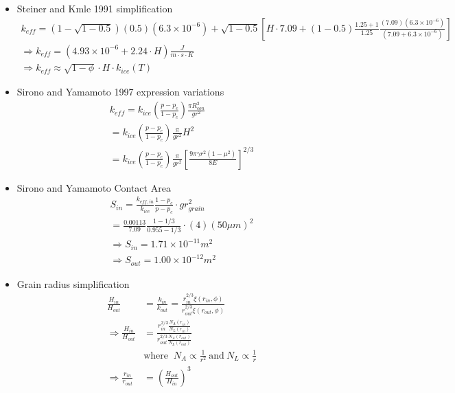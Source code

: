 \documentclass[11pt]{article} %
\begin{document}
\begin{itemize}
\item Steiner and Kmle 1991 simplification
	\begin{equation}
	\begin{gathered}
	k_{eff} = (1-\sqrt{1-0.5})(0.5)(6.3\times10^{-6}) + \sqrt{1-0.5} [ H \cdot 7.09+(1-0.5)\frac{1.25+1}{1.25}\frac{(7.09)(6.3\times10^{-6})}{(7.09+6.3\times10^{-6})} ] \\
	\Rightarrow k_{eff} = ( 4.93\times 10^{-6} + 2.24\cdot H )  \frac{J}{m \cdot s \cdot K} \\
	\Rightarrow k_{eff} \approx \sqrt{1-\phi}\cdot H \cdot k_{ice}(T)
	\end{gathered}
	\end{equation}

\item Sirono and Yamamoto 1997 expression variations
	\begin{equation}
	\begin{gathered}
	k_{eff}=k_{ice}\left( \frac{p-p_{c}}{1-p_{c}} \right) \frac{\pi R_{con}^{2}}{gr^{2}} \\
		 =k_{ice}\left( \frac{p-p_{c}}{1-p_{c}} \right) \frac{\pi}{g r^{2}} H^{2} \\
		 = k_{ice}\left( \frac{p-p_{c}}{1-p_{c}} \right) \frac{\pi}{g r^{2}}[ \frac{9 \pi \gamma r^{2} (1-\mu^{2})}{8 E} ]^{2/3}
	\end{gathered}
	\end{equation}
	
\item Sirono and Yamamoto Contact Area
	\begin{equation}
	\begin{gathered}
	S_{in} = \frac{k_{eff, in}}{k_{ice}} \frac{1-p_{c}}{p - p_{c}}\cdot g r_{grain}^{2} \\
	= \frac{0.00113}{7.09} \frac{1-1/3}{0.955-1/3} \cdot (4)(50 \mu m)^2 \\
	\Rightarrow S_{in} = 1.71\times 10^{-11} m^{2} \\
	\Rightarrow S_{out} = 1.00\times 10^{-12} m^{2}
	\end{gathered}
	\end{equation}
	
\item Grain radius simplification
	\begin{equation}
	\begin{split}
	\frac{H_{in}}{H_{out}} &= \frac{k_{in}}{k_{out}} = \frac{r_{in}^{2/3} \xi(r_{in}, \phi)}{r_{out}^{2/3} \xi(r_{out}, \phi)} \\
	\Rightarrow \frac{H_{in}}{H_{out}} &= \frac{r_{in}^{2/3} \frac{N_{A}(r_{in})}{N_{L}(r_{in})}}{r_{out}^{2/3} \frac{N_{A}(r_{out})}{N_{L}(r_{out})}} \\
	& \text{where }\: N_{A}\varpropto \frac{1}{r^{2}} \: \text{and} \: N_{L}\varpropto \frac{1}{r} \\
	\Rightarrow \frac{r_{in}}{r_{out}} &= (\frac{H_{out}}{H_{in}})^{3}
	\end{split}
	\end{equation}


\end{itemize}
\end{document}
